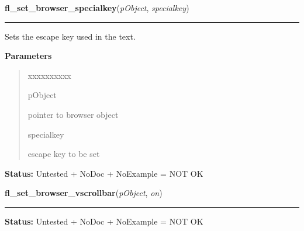 \hspace{.8\funcindent}\begin{boxedminipage}{\funcwidth}

    \raggedright \textbf{fl\_set\_browser\_specialkey}(\textit{pObject}, \textit{specialkey})

    \vspace{-1.5ex}

    \rule{\textwidth}{0.5\fboxrule}
\setlength{\parskip}{2ex}
    Sets the escape key used in the text.

\setlength{\parskip}{1ex}
      \textbf{Parameters}
      \vspace{-1ex}

      \begin{quote}
        \begin{Ventry}{xxxxxxxxxx}

          \item[pObject]

          pointer to browser object

          \item[specialkey]

          escape key to be set

        \end{Ventry}

      \end{quote}

\textbf{Status:} Untested + NoDoc + NoExample = NOT OK



    \end{boxedminipage}

    \label{xformslib:library:fl_set_browser_vscrollbar}

    \vspace{0.5ex}

\hspace{.8\funcindent}\begin{boxedminipage}{\funcwidth}

    \raggedright \textbf{fl\_set\_browser\_vscrollbar}(\textit{pObject}, \textit{on})

    \vspace{-1.5ex}

    \rule{\textwidth}{0.5\fboxrule}
\setlength{\parskip}{2ex}
\setlength{\parskip}{1ex}
\textbf{Status:} Untested + NoDoc + NoExample = NOT OK



    \end{boxedminipage}

